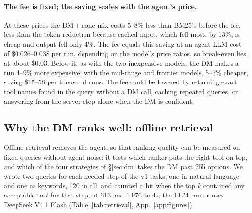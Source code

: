 \documentclass[11pt]{article}
\newcommand{\dmn}{DM\,+\,none}
\begin{document}
\paragraph{The fee is fixed; the saving scales with the agent's price.} At these prices the \dmn{} mix costs
5--8\% less than BM25's before the fee, less than the token reduction because cached input, which fell most, by
13\%, is cheap and output fell only 4\%. The fee equals this saving at an agent-LLM cost of \$0.026--0.038 per
run, depending on the model's price ratios, so break-even lies at about \$0.03. Below it, as with the two
inexpensive models, the DM makes a run 4--9\% more expensive; with the mid-range and frontier models, 5--7\%
cheaper, saving \$15--58 per thousand runs. The fee could be lowered by returning exact tool names found in the
query without a DM call, caching repeated queries, or answering from the server step alone when the DM is
confident.

\subsection{Why the DM ranks well: offline retrieval}\label{sec:retrieval}
Offline retrieval removes the agent, so that ranking quality can be measured on fixed queries without agent
noise: it tests which ranker puts the right tool on top, and which of the four strategies of \S\ref{sec:dm} takes
the DM past 255 options. We wrote two queries for each needed step of the v1 tasks, one in natural language and
one as keywords, 120 in all, and counted a hit when the top $k$ contained any acceptable tool for that step, at
613 and 1{,}076 tools; the LLM router uses DeepSeek V4.1 Flash (Table~\ref{tab:retrieval},
App.~\ref{app:figures}).
\end{document}
